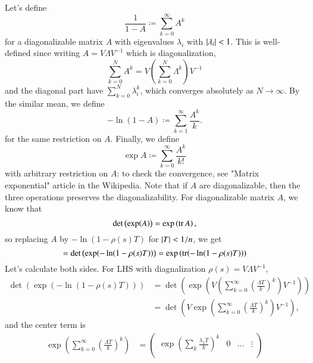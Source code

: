 \documentclass[a4paper, 12pt]{article}
\theoremstyle{Mydefinition}
\theoremstyle{Mytheorem}
\begin{document}
\begin{enumerate}
Let's define
\begin{equation}
    \frac{1}{1-A} \coloneqq \sum_{k=0}^\infty A^k
\end{equation}
for a diagonalizable matrix $A$ with eigenvalues $\lambda_i$ with $\abs{\lambda_i}<1$. This is well-defined since writing $A= V\Lambda V^{-1}$ which is diagonalization,
\begin{equation}
    \sum_{k=0}^N A^k = V\left(\sum_{k=0}^N \Lambda^k\right)V^{-1}
\end{equation}
and the diagonal part have $\sum_{k=0}^N \lambda_i^k$, which converges absolutely as $N\rightarrow \infty$. By the similar mean, we define
\begin{equation}
    -\ln(1-A)\coloneqq \sum_{k=1}^\infty \frac{A^k}{k}.
\end{equation}
for the same restriction on $A$. Finally, we define
\begin{equation}
    \exp A \coloneqq \sum_{k=0}^\infty \frac{A^k}{k!}
\end{equation}
with arbitrary restriction on $A$: to check the convergence, see "Matrix exponential" article in the Wikipedia. Note that if $A$ are diagonalizable, then the three operations preserves the diagonalizability. For diagonalizable matrix $A$, we know that
\begin{equation}\label{HW10:Eq:9}
    \det\left(\exp(A)\right) = \exp\left(\tr A\right),
\end{equation}
so replacing $A$ by $-\ln(1-\rho(s)T)$ for $\abs{T}<1/n$, we get
\begin{equation}\label{HW10:Eq:8}
    =\det\left(\exp(-\ln (1-\rho(s)T))\right) = \exp\left(\tr (-\ln (1-\rho(s)T))\right)
\end{equation}
Let's calculate both sides. For LHS with diagnalization $\rho(s) = V\Lambda V^{-1}$,
\begin{equation}
\begin{split}
    \det\left(\exp(-\ln (1-\rho(s)T))\right) &= \det\left(\exp(V\left(\sum_{k=0}^\infty \left(\frac{\Lambda T}{k}\right)^k\right)V^{-1})\right)\\
    &=\det\left(V\exp(\sum_{k=0}^\infty \left(\frac{\Lambda T}{k}\right)^k)V^{-1}\right),
\end{split}
\end{equation}
and the center term is
\begin{equation}\label{HW10:Eq:7}
\begin{split}
    \exp(\sum_{k=0}^\infty \left(\frac{\Lambda T}{k}\right)^k) &= \begin{pmatrix}\exp\left(\sum_k\frac{\lambda_1 T}{k}\right)^k & 0& \hdots &\vdots\\

\end{pmatrix}
\end{split}
\end{equation}
\end{enumerate}
\end{document}
